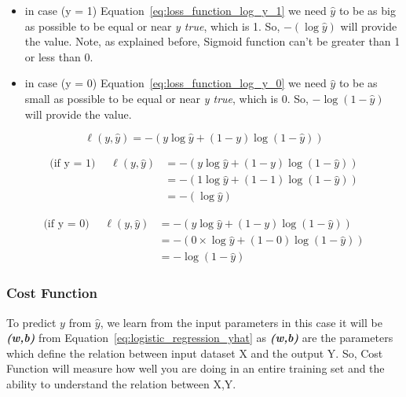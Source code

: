 \begin{itemize}
\item in case (y = 1) Equation~\eqref{eq:loss_function_log_y_1} we need $\widehat{y}$ to be as big as possible to be equal or near \textit{y true}, which is 1. So, $ - (\log \widehat{y} )$ will provide the value. Note, as explained before, Sigmoid function can't be greater than 1 or less than 0. 
\item in case (y = 0) Equation~\eqref{eq:loss_function_log_y_0} we need $\widehat{y}$ to be as small as possible to be equal or near \textit{y true}, which is 0. So, $- \log (1-\widehat{y})$ will provide the value. 
 \end{itemize}
 
\begin{equation}
 \label{eq:loss_function}
  \ell(y,\widehat{y}) = - (y \log \widehat{y} + (1-y) \log (1-\widehat{y}))
 \end{equation}

\begin{equation} \label{eq:loss_function_log_y_1}
\begin{split}
 \text{(if y = 1) } \quad \ell(y,\widehat{y}) & = - (y \log \widehat{y} + (1-y) \log (1-\widehat{y})) \\
 & = - (1 \log \widehat{y} + (1-1) \log (1-\widehat{y}))\\
 & = - (\log \widehat{y} )
\end{split}
\end{equation}


\begin{equation} \label{eq:loss_function_log_y_0}
\begin{split}
 \text{(if y = 0) } \quad \ell(y,\widehat{y}) & = - (y \log \widehat{y} + (1-y) \log (1-\widehat{y})) \\
 & = - (0 \times \log \widehat{y} + (1-0) \log (1-\widehat{y}))\\
 & = - \log (1-\widehat{y})
\end{split}
\end{equation}

\subsubsection{Cost Function}

To predict $y$ from $\widehat{y}$, we learn from the input parameters in this case it will be \textbf{\textit{(w,b)}} from Equation~\eqref{eq:logistic_regression_yhat} as \textbf{\textit{(w,b)}} are the parameters which define the relation between input dataset X and the output Y. So, Cost Function will measure how well you are doing in an entire training set and the ability to understand the relation between X,Y.

